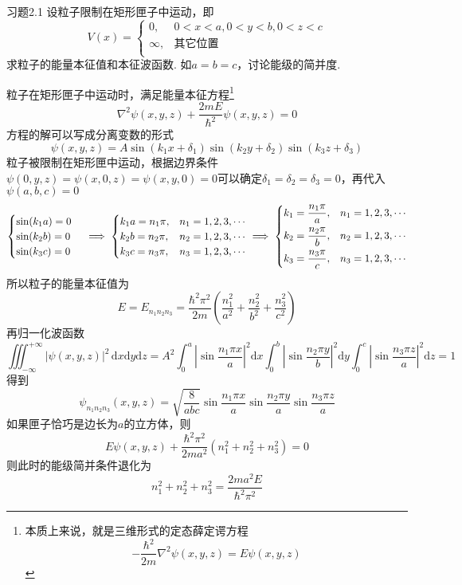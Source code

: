 \begin{question}{习题2.1}
    设粒子限制在矩形匣子中运动，即
    $$
        V(x) = \begin{cases}
            0,      & 0<x<a, 0<y<b, 0<z<c \\
            \infty, & \text{其它位置}         \\
        \end{cases}
    $$
    求粒子的能量本征值和本征波函数. 如$a=b=c$，讨论能级的简并度.
\end{question}
\begin{solution}
    粒子在矩形匣子中运动时，满足能量本征方程\footnote{本质上来说，就是三维形式的定态薛定谔方程$$-\frac{\hbar^2}{2m}\nabla^2\psi(x,y,z)=E\psi(x,y,z)$$}
    $$
        \nabla^2\psi(x,y,z) + \frac{2mE}{\hbar^2}\psi(x,y,z)= 0
    $$
    方程的解可以写成分离变数的形式
    $$
        \psi(x,y,z)=A\sin(k_1x+\delta_1)\sin(k_2y+\delta_2)\sin(k_3z+\delta_3)
    $$
    粒子被限制在矩形匣中运动，根据边界条件$\psi(0,y,z)=\psi(x,0,z)=\psi(x,y,0)=0$可以确定$\delta_1=\delta_2=\delta_3=0$，再代入$\psi(a,b,c)=0$
    $$
        \begin{cases}
            \sin(k_1a)=0 \\
            \sin(k_2b)=0 \\
            \sin(k_3c)=0 \\
        \end{cases}
        \implies
        \begin{cases}
            k_1a = n_1\pi, & n_1=1,2,3,\cdots \\
            k_2b = n_2\pi, & n_2=1,2,3,\cdots \\
            k_3c = n_3\pi, & n_3=1,2,3,\cdots \\
        \end{cases}
        \implies
        \begin{dcases}
            k_1=\frac{n_1\pi}{a}, & n_1=1,2,3,\cdots \\
            k_2=\frac{n_2\pi}{b}, & n_2=1,2,3,\cdots \\
            k_3=\frac{n_3\pi}{c}, & n_3=1,2,3,\cdots \\
        \end{dcases}
    $$
    所以粒子的能量本征值为
    $$
        E=E_{n_1n_2n_3}=\frac{\hbar^2\pi^2}{2m}\left(\frac{n_1^2}{a^2}+\frac{n_2^2}{b^2}+\frac{n_3^2}{c^2}\right)
    $$
    再归一化波函数
    $$
        \iiint_{-\infty}^{+\infty}|\psi(x,y,z)|^2\,\mathrm{d}x\mathrm{d}y\mathrm{d}z
        =A^2\int_{0}^{a}\left|\sin\frac{n_1\pi x}{a}\right|^2\mathrm{d}x
        \int_{0}^{b}\left|\sin\frac{n_2\pi y}{b}\right|^2\mathrm{d}y
        \int_{0}^{c}\left|\sin\frac{n_3\pi z}{a}\right|^2\mathrm{d}z
        =1
    $$
    得到
    $$
        \psi_{n_1n_2n_3}(x,y,z) = \sqrt{\frac{8}{abc}}\sin\frac{n_1\pi x}{a}\sin\frac{n_2\pi y}{a}\sin\frac{n_3\pi z}{a}
    $$
    如果匣子恰巧是边长为$a$的立方体，则
    $$
        E\psi(x,y,z) + \frac{\hbar^2\pi^2}{2ma^2}\left(n_1^2+n_2^2+n_3^2\right) = 0
    $$
    则此时的能级简并条件退化为
    $$
        n_1^2+n_2^2+n_3^2 = \frac{2ma^2E}{\hbar^2\pi^2}
    $$
\end{solution}




